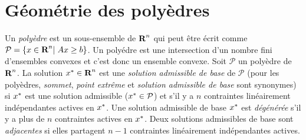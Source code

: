 \section{Géométrie des polyèdres}

Un \emph{polyèdre} est un sous-ensemble de ${\mbox{\bf R}}^n$ qui peut être écrit comme ${\mathcal P}=\{x \in {\mbox{\bf R}}^n |\;  Ax \geq b \}$. Un polyédre est une
intersection d'un nombre fini d'ensembles convexes et c'est donc un ensemble convexe. Soit
$\mathcal P$ un poly\`edre de
${\mbox{\bf R}}^n$. La solution
$x^*
\in {\mbox{\bf R}}^n$ est une
\emph{solution admissible de base}  de
$\mathcal P$ (pour les poly\`edres, \emph{sommet}, \emph{point extrême} et \emph{solution admissible de base} sont synonymes)
si  $x^*$ est une solution admissible ($x^*
\in {\mathcal{P}}$) et s'il y a
$n$ contraintes linéairement indépendantes actives en
$x^*$. Une solution admissible de base $x^*$ est \emph{dégénérée}     s'il y a plus de $n$ contraintes actives en
$x^*$. Deux solutions admissibles de base sont \emph{adjacentes}   si elles partagent $n-1$ contraintes linéairement indépendantes
actives.\\


\newpage



